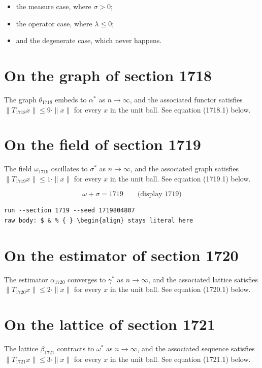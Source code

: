 \documentclass{article}
\begin{document}
\begin{itemize}
  \item the measure case, where $\sigma > 0$;
  \item the operator case, where $\lambda \leq 0$;
  \item and the degenerate case, which never happens.
\end{itemize}

\section{On the graph of section 1718}
The graph $\theta_{1718}$ embeds to $\alpha^{*}$ as $n \to \infty$,
and the associated functor satisfies $\|T_{1718} x\| \leq 9 \cdot \|x\|$
for every $x$ in the unit ball. See equation (1718.1) below.

\section{On the field of section 1719}
The field $\omega_{1719}$ oscillates to $\sigma^{*}$ as $n \to \infty$,
and the associated graph satisfies $\|T_{1719} x\| \leq 1 \cdot \|x\|$
for every $x$ in the unit ball. See equation (1719.1) below.

$$
\omega + \sigma = 1719 \qquad \text{(display 1719)}
$$

\begin{verbatim}
run --section 1719 --seed 1719804807
raw body: $ & % { } \begin{align} stays literal here
\end{verbatim}

\section{On the estimator of section 1720}
The estimator $\alpha_{1720}$ converges to $\gamma^{*}$ as $n \to \infty$,
and the associated lattice satisfies $\|T_{1720} x\| \leq 2 \cdot \|x\|$
for every $x$ in the unit ball. See equation (1720.1) below.

\section{On the lattice of section 1721}
The lattice $\beta_{1721}$ contracts to $\omega^{*}$ as $n \to \infty$,
and the associated sequence satisfies $\|T_{1721} x\| \leq 3 \cdot \|x\|$
for every $x$ in the unit ball. See equation (1721.1) below.
\end{document}
